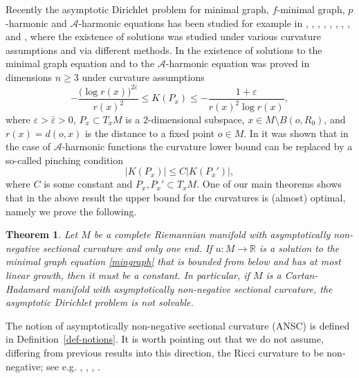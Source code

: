 \documentclass[10pt,a4paper,reqno]{amsart}
\newcommand{\ve}{\varepsilon}
\newcommand{\R}{\mathbb{R}}
\numberwithin{equation}{section}
\theoremstyle{plain}
\newtheorem{thm}{Theorem}[section]
\theoremstyle{definition}
\begin{document}
Recently the asymptotic Dirichlet problem for minimal graph, $f$-minimal graph, $p$-harmonic and $\mathcal{A}$-harmonic equations 
has been studied for example in 
\cite{HoVa}, \cite{Va1}, \cite{Va2}, \cite{CHR}, \cite{HR_ns}, \cite{CHR1}, \cite{CHH1}, \cite{CHH2}, and \cite{He},  
where the existence of solutions 
was studied under various curvature assumptions and via different methods.
In \cite{CHR1} the existence of solutions to the minimal graph equation and to
the $\mathcal{A}$-harmonic equation was proved in dimensions $n\ge 3$ under curvature assumptions
	\begin{equation}\label{CHR_curvas}
	-\frac{\big(\log r(x))^{2\bar\ve}}{r(x)^2} \le K(P_x) \le -\frac{1+\ve}{r(x)^2 \log r(x)},
	\end{equation}
where $\ve>\bar\ve>0$, $P_x\subset T_xM$ is a $2$-dimensional subspace, $x\in M\setminus B(o,R_0)$, and $r(x) = d(o,x)$ is the distance to
a fixed point $o\in M$. In \cite{He} it was shown that
in the case of $\mathcal{A}$-harmonic functions the curvature lower bound can be replaced by a so-called
pinching condition
    \[
      |K(P_x)| \le C|K(P_x')|,
    \]
where $C$ is some constant and $P_x,P_x'\subset T_xM$.
One of our main theorems shows that in the above result the upper bound for the curvatures
is (almost) optimal, namely we prove the following.
\begin{thm}\label{bernstein} 
    Let $M$ be a complete Riemannian manifold with asymptotically non-negative sectional curvature and only one end. If 
    $u\colon M\to \R$ is a solution to the minimal graph equation \eqref{mingraph} that is bounded from below and has 
    at most linear growth, then it must be a constant.
    In particular, if $M$ is a Cartan-Hadamard manifold with asymptotically non-negative sectional curvature, the asymptotic Dirichlet problem is not solvable.
 \end{thm}
The notion of asymptotically non-negative sectional curvature (ANSC) is defined in Definition~\ref{def-notions}. 
It is worth pointing out that we do not assume, differing from previous results into this direction, the Ricci curvature to be non-negative;  see
e.g. \cite{RSS}, \cite{DJX}, \cite{DL}, \cite{Dajczer2016}.
   
\end{document}
